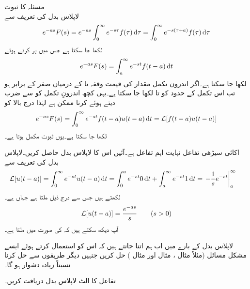 \quad مسئلہ  کا ثبوت\\
لاپلاس بدل کی تعریف سے 
\begin{align*}
e^{-as}F(s)=e^{-as}\int_{0}^{\infty}e^{-s\tau}f(\tau)\dif \tau=\int_{0}^{\infty}e^{-s(\tau+a)}f(\tau)\dif \tau
\end{align*}
لکھا جا سکتا ہے جس میں  پر کرتے ہوئے
\begin{align*}
e^{-as}F(s)=\int_{a}^{\infty}e^{-st}f(t-a)\dif t
\end{align*}
لکھا جا سکتا ہے۔اگر اندرون تکمل مقدار کی قیمت وقفہ  تا  کے درمیان صفر کے برابر ہو تب  اس تکمل کے حدود  کو  تا  لکھا جا سکتا ہے۔یہی کچھ اندرونِ تکمل کو  سے ضرب دیتے ہوئے کرنا ممکن ہے لہٰذا درج بالا کو 
\begin{align*}
e^{-as}F(s)=\int_{0}^{\infty}e^{-st}f(t-a)u(t-a)\dif t=\Laplace[f(t-a)u(t-a)]
\end{align*}
لکھا جا سکتا ہے۔یوں ثبوت مکمل ہوتا ہے۔

اکائی سیڑھی تفاعل نہایت اہم تفاعل ہے۔آئیں اس کا لاپلاس بدل حاصل کریں۔لاپلاس بدل کی تعریف سے
\begin{align*}
\Laplace[u(t-a)]&=\int_{0}^{\infty} e^{-st}u(t-a)\dif t=\int_{0}^{a}e^{-st} 0 \dif t+\int_{a}^{\infty}e^{-st} 1\dif t=\left. -\frac{1}{s}e^{-st}\right|_{a}^{\infty}
\end{align*}
لکھتے ہیں جس سے درج ذیل ملتا ہے جہاں  ہے۔
\begin{align}\label{مساوات_لاپلاس_اکائی_سیڑھی}
\mathcal{L}[u(t-a)]=\frac{e^{-as}}{s}\quad \quad (s>0)
\end{align}
آپ دیکھ سکتے ہیں کہ  کی صورت میں  ملتا ہے۔

لاپلاس بدل کے بارے میں اب ہم اتنا جانتے ہیں کہ اس کو استعمال کرتے ہوئے ایسے مشکل مسائل  (مثلاً مثال ، مثال  اور مثال ) حل کریں جنہیں دیگر طریقوں سے حل کرنا نسبتاً زیادہ دشوار ہو گا۔

تفاعل  کا الٹ لاپلاس بدل دریافت کریں۔

